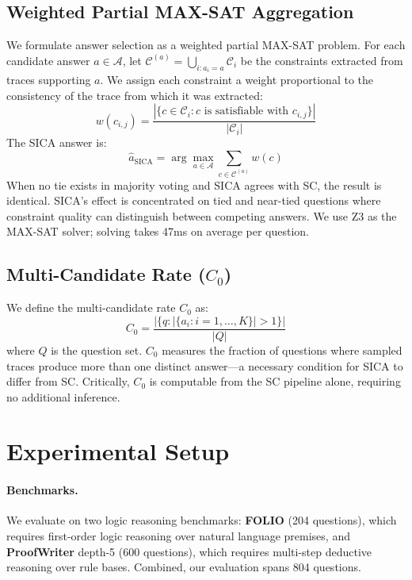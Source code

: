 \documentclass[11pt,a4paper]{article}
\begin{document}
\subsection{Weighted Partial MAX-SAT Aggregation}

We formulate answer selection as a weighted partial MAX-SAT problem.
For each candidate answer $a \in \mathcal{A}$, let $\mathcal{C}^{(a)} = \bigcup_{i: a_i = a} \mathcal{C}_i$ be the constraints extracted from traces supporting $a$.
We assign each constraint a weight proportional to the consistency of the trace from which it was extracted:
\begin{equation}
    w(c_{i,j}) = \frac{|\{c \in \mathcal{C}_i : c \text{ is satisfiable with } c_{i,j}\}|}{|\mathcal{C}_i|}
\end{equation}
The SICA answer is:
\begin{equation}
    \hat{a}_{\text{SICA}} = \arg\max_{a \in \mathcal{A}} \sum_{c \in \mathcal{C}^{(a)}} w(c)
\end{equation}
When no tie exists in majority voting and SICA agrees with SC, the result is identical.
SICA's effect is concentrated on tied and near-tied questions where constraint quality can distinguish between competing answers.
We use Z3 as the MAX-SAT solver; solving takes 47ms on average per question.

\subsection{Multi-Candidate Rate ($C_0$)}

We define the multi-candidate rate $C_0$ as:
\begin{equation}
    C_0 = \frac{|\{q : |\{a_i : i = 1, \ldots, K\}| > 1\}|}{|Q|}
\end{equation}
where $Q$ is the question set.
$C_0$ measures the fraction of questions where sampled traces produce more than one distinct answer---a necessary condition for SICA to differ from SC.
Critically, $C_0$ is computable from the SC pipeline alone, requiring no additional inference.


\section{Experimental Setup}
\label{sec:setup}

\paragraph{Benchmarks.}
We evaluate on two logic reasoning benchmarks:
\textbf{FOLIO} (204 questions), which requires first-order logic reasoning over natural language premises, and
\textbf{ProofWriter} depth-5 (600 questions), which requires multi-step deductive reasoning over rule bases.
Combined, our evaluation spans 804 questions.
\end{document}
